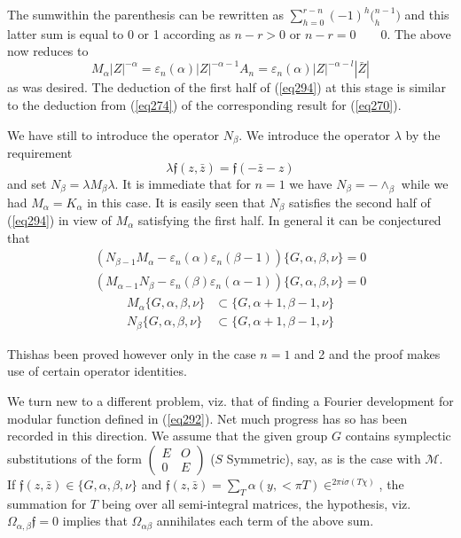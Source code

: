 The sum\pageoriginale within the parenthesis can be rewritten as
$\sum\limits^{r - n}_{h = 0} (-1)^h \big(^{n - 1}_h)$ and this latter
sum is equal to 0 or 1 according as $n - r > 0$ or $n - r =0 \qquad
0$. The above now reduces to  
$$
M_\alpha |Z|^{- \alpha} = \varepsilon_n (\alpha) |Z|^{- \alpha - 1}
A_n = \varepsilon_n (\alpha) |Z|^{-\alpha -l} |\bar{Z}| 
$$
as was desired. The deduction of the first half of (\ref{eq294}) at this
stage is similar to the deduction from (\ref{eq274}) of the corresponding
result for (\ref{eq270}). 

We have still to introduce the operator $N_\beta$. We introduce the
operator $\lambda$ by the requirement 
\begin{equation*}
\lambda \mathfrak{f} (z, \bar{z}) = \mathfrak{f} (- \bar{z} - z)
\tag{302}\label{eq302} 
\end{equation*}
and set $N_\beta = \lambda M_\beta \lambda$. It is immediate that for
$n =1$ we  have $N_\beta = - \wedge_\beta$ while we had $M_\alpha =
K_\alpha$ in this case. It is easily seen that $N_\beta$ satisfies the
second half of (\ref{eq294}) in view of $M_\alpha$ satisfying the first
half. In general it can be conjectured that 
\begin{gather*}
(N_{\beta - 1} M_\alpha - \varepsilon_n (\alpha) \varepsilon_n (\beta
  - 1)) \{G, \alpha, \beta, \nu \} = 0\\ 
(M_{\alpha - 1} N_\beta - \varepsilon_n (\beta) \varepsilon_n (\alpha
  - 1)) \{G, \alpha, \beta, \nu \} = 0 \tag{303}\label{eq303} 
\end{gather*}
\begin{align*}
M_{\alpha} \{G, \alpha, \beta, \nu \} & \subset \{G, \alpha +1, \beta
- 1, \nu \}\\ 
N_{\beta} \{G, \alpha, \beta, \nu \} & \subset \{G, \alpha +1, \beta -
1, \nu \} 
\end{align*}

This\pageoriginale has been proved however only in the case $n =1$ and
2 and the proof makes use of certain operator identities.  
 
We turn new to a different problem, viz. that of finding a Fourier
development for modular function defined in (\ref{eq292}). Net much progress
has so has been recorded in this direction. We assume that the given
group $G$ contains symplectic substitutions of the form
$\begin{pmatrix} E & O \\ 0 & E \end{pmatrix}$ ($S$ Symmetric), say, as
is the case with $\mathcal{M}$. If $\mathfrak{f} (z, \bar{z}) \in \{G,
\alpha, \beta, \nu \}$ and $\mathfrak{f} (z, \bar{z})  = \sum\limits_T
\alpha (y , < \pi T) \in^{2 \pi i \sigma (T \chi)}$, the
summation for $T$ being over all semi-integral matrices, the
hypothesis, viz. $\Omega_{\alpha, \beta} \mathfrak{f} = 0$ implies
that $\Omega_{\alpha \beta}$ annihilates each term of the above sum.  

